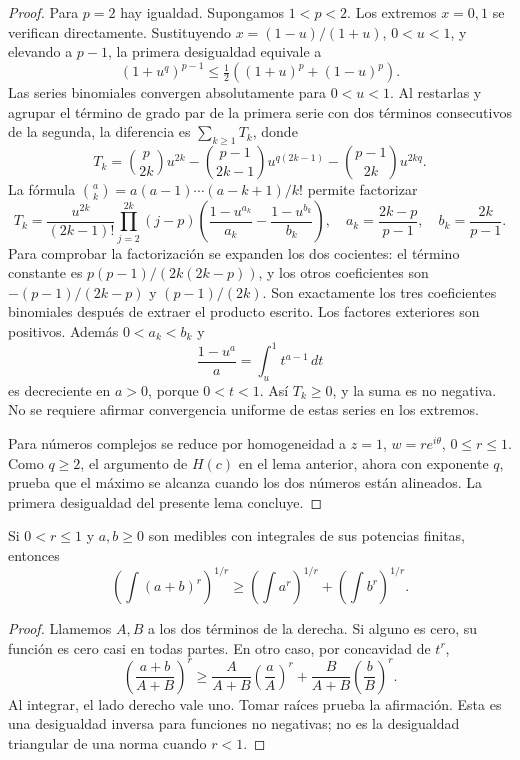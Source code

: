 \begin{proof}
Para $p=2$ hay igualdad. Supongamos $1<p<2$. Los extremos $x=0,1$ se verifican directamente. Sustituyendo $x=(1-u)/(1+u)$, $0<u<1$, y elevando a $p-1$, la primera desigualdad equivale a
\[
 (1+u^q)^{p-1}\le\tfrac12((1+u)^p+(1-u)^p).
\]
Las series binomiales convergen absolutamente para $0<u<1$. Al restarlas y agrupar el término de grado par de la primera serie con dos términos consecutivos de la segunda, la diferencia es $\sum_{k\ge1}T_k$, donde
\[
 T_k=\binom p{2k}u^{2k}-\binom{p-1}{2k-1}u^{q(2k-1)}-\binom{p-1}{2k}u^{2kq}.
\]
La fórmula $\binom ak=a(a-1)\cdots(a-k+1)/k!$ permite factorizar
\[
 T_k=\frac{u^{2k}}{(2k-1)!}\prod_{j=2}^{2k}(j-p)
 \left(\frac{1-u^{a_k}}{a_k}-\frac{1-u^{b_k}}{b_k}\right),
 \quad a_k=\frac{2k-p}{p-1},\quad b_k=\frac{2k}{p-1}.
\]
Para comprobar la factorización se expanden los dos cocientes: el término constante es $p(p-1)/(2k(2k-p))$, y los otros coeficientes son $-(p-1)/(2k-p)$ y $(p-1)/(2k)$. Son exactamente los tres coeficientes binomiales después de extraer el producto escrito. Los factores exteriores son positivos. Además $0<a_k<b_k$ y
\[
 \frac{1-u^a}{a}=\int_u^1t^{a-1}\,dt
\]
es decreciente en $a>0$, porque $0<t<1$. Así $T_k\ge0$, y la suma es no negativa. No se requiere afirmar convergencia uniforme de estas series en los extremos.

Para números complejos se reduce por homogeneidad a $z=1$, $w=re^{i\theta}$, $0\le r\le1$. Como $q\ge2$, el argumento de $H(c)$ en el lema anterior, ahora con exponente $q$, prueba que el máximo se alcanza cuando los dos números están alineados. La primera desigualdad del presente lema concluye.
\end{proof}
\begin{lema}\label{v2:minkowski-inversa}
Si $0<r\le1$ y $a,b\ge0$ son medibles con integrales de sus potencias finitas, entonces
\[
 \left(\int(a+b)^r\right)^{1/r}\ge
 \left(\int a^r\right)^{1/r}+\left(\int b^r\right)^{1/r}.
\]
\end{lema}
\begin{proof}
Llamemos $A,B$ a los dos términos de la derecha. Si alguno es cero, su función es cero casi en todas partes. En otro caso, por concavidad de $t^r$,
\[
 \left(\frac{a+b}{A+B}\right)^r\ge
 \frac A{A+B}\left(\frac aA\right)^r+
 \frac B{A+B}\left(\frac bB\right)^r.
\]
Al integrar, el lado derecho vale uno. Tomar raíces prueba la afirmación. Esta es una desigualdad inversa para funciones no negativas; no es la desigualdad triangular de una norma cuando $r<1$.
\end{proof}
